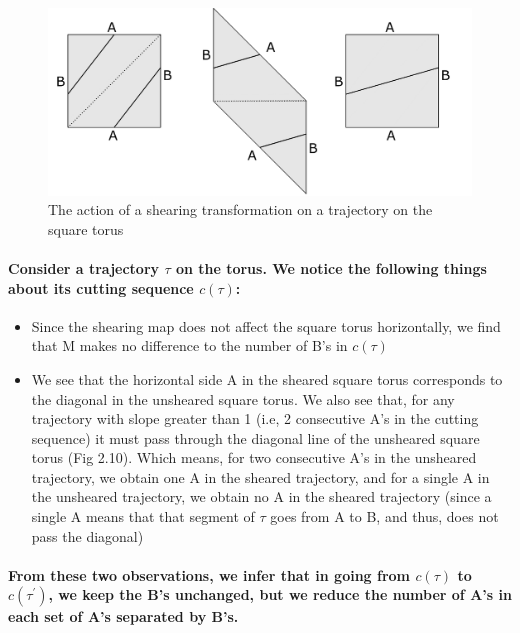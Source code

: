 \documentclass{report}
\begin{document}
\begin{figure} 
\begin{center}
\includegraphics[scale=0.3]{2.10}
\caption{The action of a shearing transformation on a trajectory on the square torus}
\end{center}
\end{figure}

\paragraph{Consider a trajectory $\tau$ on the torus. We notice the following things about its cutting sequence $c(\tau)$:}
\begin{itemize}
\item  {Since the shearing map does not affect the square torus horizontally, we find that M makes no difference to the number of B’s in $c(\tau)$}
\item  {We see that the horizontal side A in the sheared square torus corresponds to the diagonal in the unsheared square torus. We also see that, for any trajectory with slope greater than 1 (i.e, 2 consecutive A’s in the cutting sequence) it must pass through the diagonal line of the unsheared square torus (Fig 2.10). Which means, for two consecutive A’s in the unsheared trajectory, we obtain one A in the sheared trajectory, and for a single A in the unsheared trajectory, we obtain no A in the sheared trajectory (since a single A means that that segment of $\tau$ goes from A to B, and thus, does not pass the diagonal)}
\end{itemize}

\paragraph{From these two observations, we infer that in going from $c(\tau)$ to $c(\tau ^{'})$, we keep the B’s unchanged, but we reduce the number of A’s in each set of A’s separated by B’s. }
\end{document}
